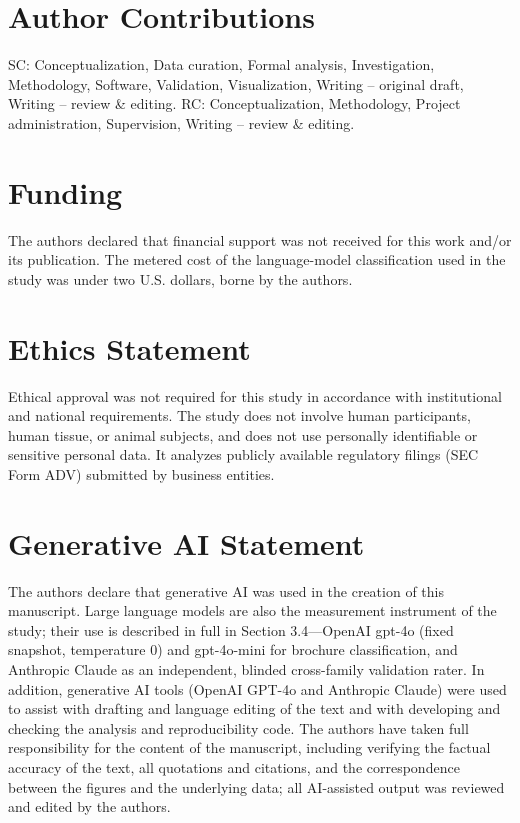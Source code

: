 \documentclass[utf8]{FrontiersinHarvard} %
\begin{document}
\section*{Author Contributions}
SC: Conceptualization, Data curation, Formal analysis, Investigation, Methodology, Software, Validation, Visualization, Writing -- original draft, Writing -- review \& editing. RC: Conceptualization, Methodology, Project administration, Supervision, Writing -- review \& editing.

\section*{Funding}
The authors declared that financial support was not received for this work and/or its publication. The metered cost of the language-model classification used in the study was under two U.S. dollars, borne by the authors.

\section*{Ethics Statement}
Ethical approval was not required for this study in accordance with institutional and national requirements. The study does not involve human participants, human tissue, or animal subjects, and does not use personally identifiable or sensitive personal data. It analyzes publicly available regulatory filings (SEC Form ADV) submitted by business entities.

\section*{Generative AI Statement}
The authors declare that generative AI was used in the creation of this manuscript. Large language models are also the measurement instrument of the study; their use is described in full in Section 3.4---OpenAI gpt-4o (fixed snapshot, temperature 0) and gpt-4o-mini for brochure classification, and Anthropic Claude as an independent, blinded cross-family validation rater. In addition, generative AI tools (OpenAI GPT-4o and Anthropic Claude) were used to assist with drafting and language editing of the text and with developing and checking the analysis and reproducibility code. The authors have taken full responsibility for the content of the manuscript, including verifying the factual accuracy of the text, all quotations and citations, and the correspondence between the figures and the underlying data; all AI-assisted output was reviewed and edited by the authors.
\end{document}
